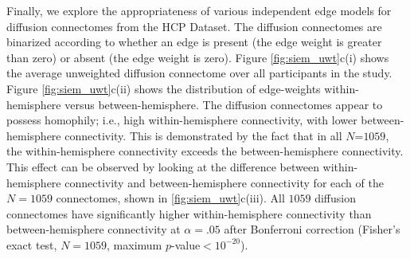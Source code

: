 Finally, we explore the appropriateness of various independent edge models for diffusion connectomes from the HCP Dataset. The diffusion connectomes are binarized according to whether an edge is present (the edge weight is greater than zero) or absent (the edge weight is zero). Figure \ref{fig:siem_uwt}c(i) shows the average unweighted diffusion connectome over all participants in the study. Figure \ref{fig:siem_uwt}c(ii) shows the distribution of edge-weights within-hemisphere versus between-hemisphere. The diffusion connectomes appear to possess homophily; i.e., high within-hemisphere connectivity, with lower between-hemisphere connectivity. This is demonstrated by the fact that in all $N$=$1059$, the within-hemisphere connectivity exceeds the between-hemisphere connectivity. This effect can be observed by looking at the difference between within-hemisphere connectivity and between-hemisphere connectivity for each of the $N=1059$ connectomes, shown in \ref{fig:siem_uwt}c(iii). All $1059$ diffusion connectomes have significantly higher within-hemisphere connectivity than between-hemisphere connectivity at $\alpha=.05$ after Bonferroni correction (Fisher's exact test, $N=1059$, maximum $p$-value$<10^{-20}$).

